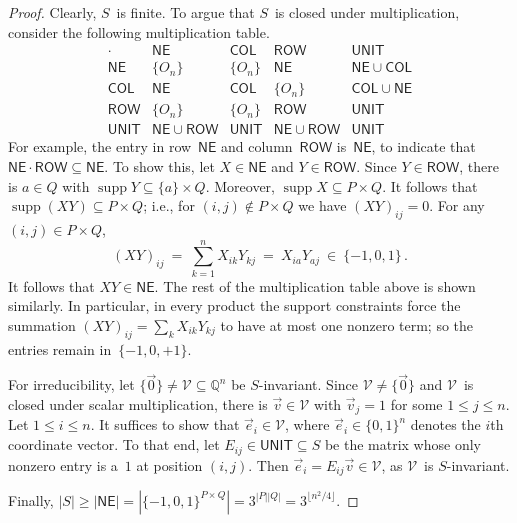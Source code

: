 \documentclass{lmcs}
\theoremstyle{definition}
\DeclareMathOperator{\supp}{supp}
\newcommand{\COL}{\mathsf{COL}}
\newcommand{\NE}{\mathsf{NE}}
\newcommand{\Q}{\mathbb{Q}}
\newcommand{\ROW}{\mathsf{ROW}}
\newcommand{\UNIT}{\mathsf{UNIT}}
\newcommand{\V}{\mathcal{V}}
\begin{document}
\begin{proof}
Clearly, $S$~is finite.
To argue that $S$~is closed under multiplication, consider the following multiplication table.
\[
\begin{array}{c|cccc}
\mathord{\cdot}                   & \NE           & \COL  & \ROW          & \UNIT         \\ \hline
\NE                               & \{O_n\}         & \{O_n\} & \NE           & \NE \cup \COL \\
\COL                              & \NE           & \COL  & \{O_n\}         & \COL \cup \NE \\
\ROW                              & \{O_n\}         & \{O_n\} & \ROW          & \UNIT \\
\UNIT                             & \NE \cup \ROW & \UNIT & \NE \cup \ROW & \UNIT
\end{array}
\]
For example, the entry in row~$\NE$ and column~$\ROW$ is~$\NE$, to indicate that $\NE \cdot \ROW \subseteq \NE$.
To show this, let $X \in \NE$ and $Y \in \ROW$.
Since $Y \in \ROW$, there is $a \in Q$ with $\supp Y \subseteq \{a\} \times Q$.
Moreover, $\supp X \subseteq P \times Q$.
It follows that $\supp (X Y) \subseteq P \times Q$; i.e., for $(i,j) \not\in P \times Q$ we have $(X Y)_{i j} = 0$.
For any $(i,j) \in P \times Q$,
\[
 (X Y)_{i j} \ = \ \sum_{k=1}^n X_{i k} Y_{k j} \ = \ X_{i a} Y_{a j} \ \in \ \{-1,0,1\}\,.
\]
It follows that $X Y \in \NE$.
The rest of the multiplication table above is shown similarly.
In particular, in every product the support constraints force the summation $(X Y)_{i j} = \sum_{k} X_{i k} Y_{k j}$ to have at most one nonzero term; so the entries remain in~$\{-1,0,+1\}$.

For irreducibility, let $\{\vec{0}\} \ne \V \subseteq \Q^n$ be $S$-invariant.
Since $\V \ne \{\vec{0}\}$ and $\V$~is closed under scalar multiplication, there is $\vec{v} \in \V$ with ${\vec v}_j = 1$ for some $1 \le j \le n$.
Let $1 \le i \le n$.
It suffices to show that $\vec{e}_i \in \V$, where $\vec{e}_i \in \{0,1\}^n$ denotes the $i$th coordinate vector.
To that end, let $E_{i j} \in \UNIT \subseteq S$ be the matrix whose only nonzero entry is a~$1$ at position $(i,j)$.
Then $\vec{e}_i = E_{i j} \vec{v} \in \V$, as $\V$~is $S$-invariant.

Finally,
$
|S| \ge |\NE| = \left|\{-1,0,1\}^{P \times Q}\right| = 3^{|P| |Q|} = 3^{\lfloor n^2/4\rfloor}
$.
\end{proof}
\end{document}

